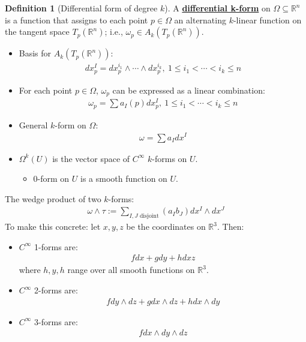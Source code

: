 \documentclass[11pt]{scrartcl}
\newcommand{\R}[0]{\mathbb{R}}
\theoremstyle{definition}
\newtheorem{definition}{Definition}
\theoremstyle{remark}
\newcommand{\dfn}[1]{\textbf{\underline{#1}}}
\begin{document}
{\begin{definition}[Differential form of degree $k$]
	A \dfn{differential k-form} on $\Omega \subseteq \R^n$ is a function that assigns to each point $p \in \Omega$ an alternating $k$-linear function on the tangent space $T_p(\R^n)$; i.e., $\omega_p \in A_k(T_p(\R^n))$. 
\end{definition}
\begin{itemize}[noitemsep]
	\item Basis for $A_k(T_p (\R^n))$: 
	\begin{align*}
		dx_p^I = dx_p^{i_1} \wedge \cdots \wedge dx_p^{i_k},\ 1 \leq i_1 < \cdots < i_k \leq n
	\end{align*}
	\item For each point $p \in \Omega$, $\omega_p$ can be expressed as a linear combination: 
	\begin{align*}
		\omega_p = \sum a_I(p) dx_p^I,\ 1 \leq i_1 < \cdots < i_k \leq n
	\end{align*}
	\item General $k$-form on $\Omega$: 
	\begin{align*}
		\omega = \sum a_I dx^I 
	\end{align*}
	\item $\Omega^k(U)$ is the vector space of $C^\infty$ $k$-forms on $U$. 
	\begin{itemize}[noitemsep]
		\item $0$-form on $U$ is a smooth function on $U$. 
	\end{itemize}
\end{itemize}
The wedge product of two $k$-forms: 
\begin{align*}
	\omega \wedge \tau := \sum_{I,J \text{ disjoint}} (a_I b_J) dx^I \wedge dx^J 
\end{align*}
To make this concrete: let $x,y,z$ be the coordinates on $\R^3$. Then:
\begin{itemize}[noitemsep]
	\item $C^\infty$ 1-forms are: 
	\begin{align*}
		fdx + gdy + hdxz 
	\end{align*}
	where $h,y,h$ range over all smooth functions on $\R^3$.
	\item $C^\infty$ 2-forms are: 
	\begin{align*}
		f dy \wedge dz + g dx \wedge dz + h dx \wedge dy 
	\end{align*}
	\item $C^\infty$ 3-forms are: 
	\begin{align*}
		f dx \wedge dy \wedge dz 
	\end{align*}
\end{itemize}

}
\end{document}
